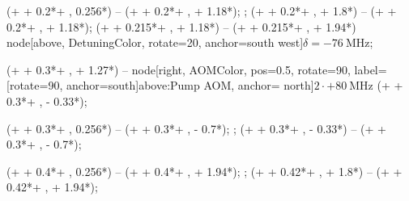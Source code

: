  (\levelLength + \levelConnect + 0.2*\levelLengthLong + \offSet,  0.256*\levelGap) 
-- (\levelLength + \levelConnect + 0.2*\levelLengthLong + \offSet, \excitedStateHigh + 1.18*\levelGap);
;
 (\levelLength + \levelConnect + 0.2*\levelLengthLong + \offSet, \excitedStateHigh + 1.8*\levelGap) -- (\levelLength + \levelConnect + 0.2*\levelLengthLong + \offSet, \excitedStateHigh + 1.18*\levelGap);
 (\levelLength + \levelConnect + 0.215*\levelLengthLong + \offSet, \excitedStateHigh + 1.18*\levelGap) 
-- (\levelLength + \levelConnect + 0.215*\levelLengthLong + \offSet, \excitedStateHigh + 1.94*\levelGap) node[above, DetuningColor, rotate=20, anchor=south west]{\footnotesize $\delta=-\SI{76}{\mega \hertz}$};

 (\levelLength + \levelConnect + 0.3*\levelLengthLong + \offSet, \excitedStateHigh + 1.27*\levelGap) 
-- node[right, AOMColor, pos=0.5, rotate=90, label={[rotate=90, anchor=south]above:{\scriptsize Pump AOM}}, anchor= north]{\scriptsize  $2 \cdot +\SI{80}{\mega \hertz}$} (\levelLength + \levelConnect + 0.3*\levelLengthLong + \offSet, \excitedStateHigh - 0.33*\levelGap);

 (\levelLength + \levelConnect + 0.3*\levelLengthLong + \offSet,  0.256*\levelGap) 
-- (\levelLength + \levelConnect + 0.3*\levelLengthLong + \offSet, \excitedStateHigh - 0.7*\levelGap);
;
 (\levelLength + \levelConnect + 0.3*\levelLengthLong + \offSet, \excitedStateHigh - 0.33*\levelGap) -- (\levelLength + \levelConnect + 0.3*\levelLengthLong + \offSet, \excitedStateHigh - 0.7*\levelGap);

 (\levelLength + \levelConnect + 0.4*\levelLengthLong + \offSet,  0.256*\levelGap) 
-- (\levelLength + \levelConnect + 0.4*\levelLengthLong + \offSet, \excitedStateHigh + 1.94*\levelGap);
;
 (\levelLength + \levelConnect + 0.42*\levelLengthLong + \offSet, \excitedStateHigh + 1.8*\levelGap) -- (\levelLength + \levelConnect + 0.42*\levelLengthLong + \offSet, \excitedStateHigh + 1.94*\levelGap);

